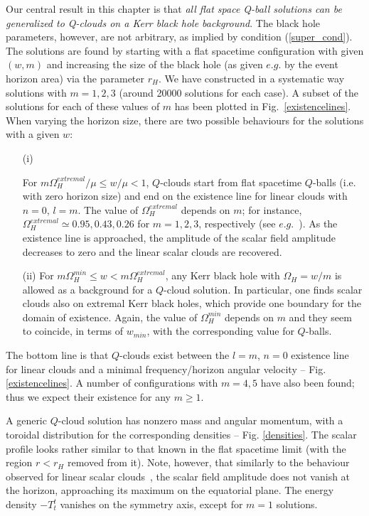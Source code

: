   
Our central result in this chapter is
that {\it all flat space Q-ball solutions can be generalized to Q-clouds on a Kerr black hole background}.
The black hole parameters, however, are not arbitrary, as implied by condition (\ref{super_cond}).
%
%
The solutions are found by starting with a flat spacetime
configuration with given $(w,m)$ and increasing the size of the black hole
(as given $e.g.$ by the event horizon area)
via the parameter $r_H$.  
We have constructed in a systematic way solutions with $m=1,2,3$ (around 20000 solutions for each case). A subset of the solutions for each of these values of $m$ has been plotted in Fig.~\ref{existencelines}.  When varying the horizon size, there are two 
possible behaviours for the solutions with a given $w$: 
\begin{itemize}
\item[(i)]

For $m\Omega_H^{extremal}/\mu\leq w/\mu <1$,  $Q$-clouds start from flat spacetime $Q$-balls (i.e. with zero horizon size)
 and end on the existence line for linear clouds with $n=0$, $l=m$. The value of $\Omega_H^{extremal}$ depends on $m$; for instance,  $\Omega_H^{extremal}\simeq 0.95,0.43,0.26$  for $m=1,2,3$, respectively (see $e.g.$~\cite{Hod:2013zza}). As the existence line is approached,
the amplitude of the scalar field amplitude 
decreases to zero and 
the linear scalar clouds are recovered.
 
\item[(ii)]
For  $m\Omega_H^{min}\leq w <m\Omega_H^{extremal}$,
any Kerr black hole with $\Omega_H=w/m$ is allowed as a background for a $Q$-cloud solution.
In particular, one finds scalar clouds also on extremal Kerr black holes,
which provide one boundary for the domain of existence. Again, the value of $\Omega_H^{min}$ depends on $m$ and they seem to coincide, in terms of $w_{min}$, with the corresponding value for $Q$-balls.
%

\end{itemize}
%
The bottom line is that $Q$-clouds exist between the $l=m$, $n=0$ existence line for linear clouds and a minimal frequency/horizon angular velocity -- Fig. \ref{existencelines}. A number of configurations with $m=4,5$
have also been found;
thus we expect their existence for any $m\geq 1$.

A generic $Q$-cloud solution has nonzero mass and angular momentum,
with a toroidal distribution for the corresponding densities -- Fig. \ref{densities}.
% 
The scalar profile looks rather similar to that known in the flat spacetime limit
(with the region $r<r_H$ removed from it).
Note, however, that similarly to the behaviour observed for linear scalar clouds~\cite{Benone:2014ssa}, 
the scalar field amplitude does not vanish at the horizon,
approaching its maximum on the equatorial plane.
The energy density $-T_t^t$
vanishes on the symmetry axis, except for $m=1$ solutions.


